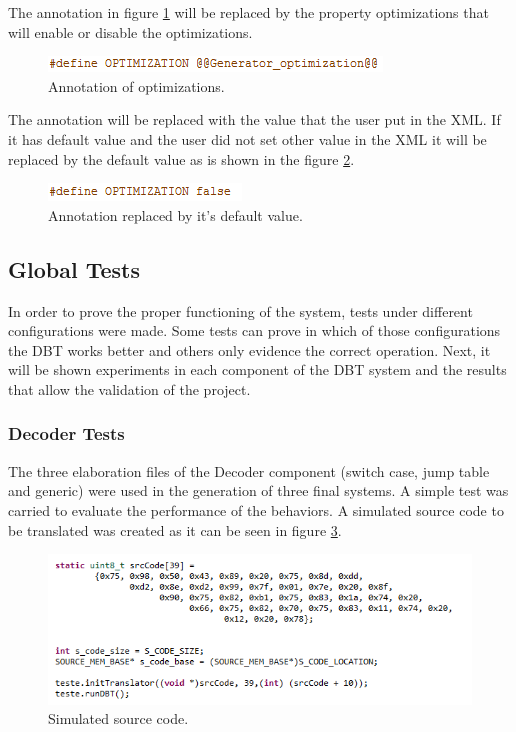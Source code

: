 The annotation in figure \ref{fig:annotation} will be replaced by the property optimizations that will enable or disable the optimizations. 

\begin{figure} [H]
	\centering
	\includegraphics[width=0.5\linewidth]{Images/anotation.PNG}
	\caption{Annotation of optimizations.}
	\label{fig:annotation}
\end{figure}

The annotation will be replaced with the value that the user put in the XML. If it has default value and the user did not set other value in the XML it will be replaced by the default value as is shown in the figure \ref{fig:annotationReplaced}.

\begin{figure} [H]
	\centering
	\includegraphics[width=0.3\linewidth]{Images/anotationReplaced.PNG}
	\caption{Annotation replaced by it's default value.}
	\label{fig:annotationReplaced}
\end{figure}

\subsection{Global Tests}

In order to prove the proper functioning of the system, tests under different configurations were made. Some tests can prove in which of those configurations the DBT works better and others only evidence the correct operation. 
Next, it will be shown experiments in each component of the DBT system and the results that allow the validation of the project.

\subsubsection{Decoder Tests}
The three elaboration files of the Decoder component (switch case, jump table and generic) were used in the generation of three final systems. A simple test was carried to evaluate the performance of the behaviors. A simulated source code to be translated was created as it can be seen in figure \ref{fig:SourceCodeDecoderTest}.

\begin{figure}[H]
\centerline{
\includegraphics[scale=0.65]{images/sourceCode.png}
}
\caption{Simulated source code.}
\label{fig:SourceCodeDecoderTest}
\end{figure}

